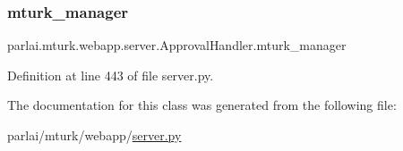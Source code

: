 \subsubsection{\texorpdfstring{mturk\+\_\+manager}{mturk\_manager}}
{\footnotesize\ttfamily parlai.\+mturk.\+webapp.\+server.\+Approval\+Handler.\+mturk\+\_\+manager}



Definition at line 443 of file server.\+py.



The documentation for this class was generated from the following file\+:\begin{DoxyCompactItemize}
\item 
parlai/mturk/webapp/\hyperlink{server_8py}{server.\+py}\end{DoxyCompactItemize}
